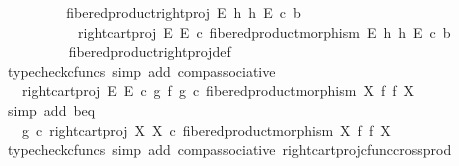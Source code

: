 \begin{isabellebody}
\ {\isacharminus}{\kern0pt}\isanewline
\ \ \ \ \ \ \isamarkupfalse%
\ {\isachardoublequoteopen}fibered{\isacharunderscore}{\kern0pt}product{\isacharunderscore}{\kern0pt}right{\isacharunderscore}{\kern0pt}proj\ E\ h\ h\ E\ {\isasymcirc}\isactrlsub c\ b\isanewline
\ \ \ \ \ \ \ \ \ \ {\isacharequal}{\kern0pt}\ right{\isacharunderscore}{\kern0pt}cart{\isacharunderscore}{\kern0pt}proj\ E\ E\ {\isasymcirc}\isactrlsub c\ fibered{\isacharunderscore}{\kern0pt}product{\isacharunderscore}{\kern0pt}morphism\ E\ h\ h\ E\ {\isasymcirc}\isactrlsub c\ b{\isachardoublequoteclose}\isanewline
\ \ \ \ \ \ \ \ \isamarkupfalse%
\ fibered{\isacharunderscore}{\kern0pt}product{\isacharunderscore}{\kern0pt}right{\isacharunderscore}{\kern0pt}proj{\isacharunderscore}{\kern0pt}def\ \isamarkupfalse%
\ {\isacharparenleft}{\kern0pt}typecheck{\isacharunderscore}{\kern0pt}cfuncs{\isacharcomma}{\kern0pt}\ simp\ add{\isacharcolon}{\kern0pt}\ comp{\isacharunderscore}{\kern0pt}associative{}{\isacharparenright}{\kern0pt}\isanewline
\ \ \ \ \ \ \isamarkupfalse%
\ \isamarkupfalse%
\ {\isachardoublequoteopen}{\isachardot}{\kern0pt}{\isachardot}{\kern0pt}{\isachardot}{\kern0pt}\ {\isacharequal}{\kern0pt}\ right{\isacharunderscore}{\kern0pt}cart{\isacharunderscore}{\kern0pt}proj\ E\ E\ {\isasymcirc}\isactrlsub c\ {\isacharparenleft}{\kern0pt}g\ {\isasymtimes}\isactrlsub f\ g{\isacharparenright}{\kern0pt}\ {\isasymcirc}\isactrlsub c\ fibered{\isacharunderscore}{\kern0pt}product{\isacharunderscore}{\kern0pt}morphism\ X\ f\ f\ X{\isachardoublequoteclose}\isanewline
\ \ \ \ \ \ \ \ \isamarkupfalse%
\ {\isacharparenleft}{\kern0pt}simp\ add{\isacharcolon}{\kern0pt}\ b{\isacharunderscore}{\kern0pt}eq{\isacharparenright}{\kern0pt}\isanewline
\ \ \ \ \ \ \isamarkupfalse%
\ \isamarkupfalse%
\ {\isachardoublequoteopen}{\isachardot}{\kern0pt}{\isachardot}{\kern0pt}{\isachardot}{\kern0pt}\ {\isacharequal}{\kern0pt}\ g\ {\isasymcirc}\isactrlsub c\ right{\isacharunderscore}{\kern0pt}cart{\isacharunderscore}{\kern0pt}proj\ X\ X\ {\isasymcirc}\isactrlsub c\ fibered{\isacharunderscore}{\kern0pt}product{\isacharunderscore}{\kern0pt}morphism\ X\ f\ f\ X{\isachardoublequoteclose}\isanewline
\ \ \ \ \ \ \ \ \isamarkupfalse%
\ {\isacharparenleft}{\kern0pt}typecheck{\isacharunderscore}{\kern0pt}cfuncs{\isacharcomma}{\kern0pt}\ simp\ add{\isacharcolon}{\kern0pt}\ comp{\isacharunderscore}{\kern0pt}associative{}\ right{\isacharunderscore}{\kern0pt}cart{\isacharunderscore}{\kern0pt}proj{\isacharunderscore}{\kern0pt}cfunc{\isacharunderscore}{\kern0pt}cross{\isacharunderscore}{\kern0pt}prod{\isacharparenright}{\kern0pt}\isanewline

\end{isabellebody}
